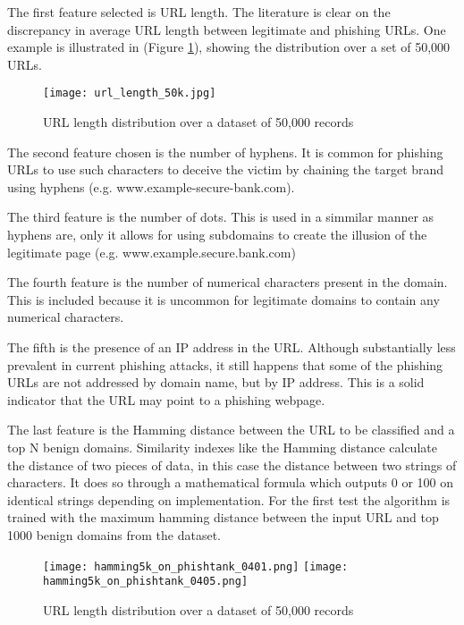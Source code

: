 	The first feature selected is URL length. The literature is clear on the discrepancy in average URL length between legitimate and phishing URLs. One example is illustrated in \cite{STACKED_ML_URL_HTML} (Figure \ref{fig:URL_LENGTH_DISTRIBUTION}), showing the distribution over a set of 50,000 URLs.

	\begin{figure}[t]
		\centering
		\texttt{[image: url\_length\_50k.jpg]}
		\caption{URL length distribution over a dataset of 50,000 records}
		\label{fig:URL_LENGTH_DISTRIBUTION}
	\end{figure}

	The second feature chosen is the number of hyphens. It is common for phishing URLs to use such characters to deceive the victim by chaining the target brand using hyphens (e.g. www.example-secure-bank.com).

	The third feature is the number of dots. This is used in a simmilar manner as hyphens are, only it allows for using subdomains to create the illusion of the legitimate page (e.g. www.example.secure.bank.com)

	The fourth feature is the number of numerical characters present in the domain. This is included because it is uncommon for legitimate domains to contain any numerical characters.

	The fifth is the presence of an IP address in the URL. Although substantially less prevalent in current phishing attacks, it still happens that some of the phishing URLs are not addressed by domain name, but by IP address. This is a solid indicator that the URL may point to a phishing webpage.

	The last feature is the Hamming distance between the URL to be classified and a top N benign domains. Similarity indexes like the Hamming distance calculate the distance of two pieces of data, in this case the distance between two strings of characters. It does so through a mathematical formula which outputs 0 or 100 on identical strings depending on implementation. For the first test the algorithm is trained with the maximum hamming distance between the input URL and top 1000 benign domains from the \cite{MAJESTIC_MILLION} dataset.

	\begin{figure}
		\centering
		\texttt{[image: hamming5k\_on\_phishtank\_0401.png]}
		\texttt{[image: hamming5k\_on\_phishtank\_0405.png]}
		\caption{URL length distribution over a dataset of 50,000 records}
		\label{fig:HAMMING_ON_PHISHTANK}
	\end{figure}

